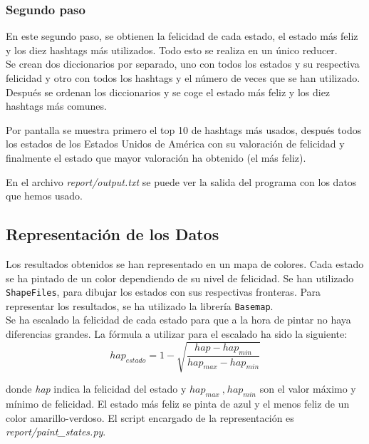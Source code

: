 \documentclass[12pt,a4paper]{article}
\begin{document}
\begin{itemize}
\subsubsection{Segundo paso}

En este segundo paso, se obtienen  la felicidad de cada estado, el estado más feliz y los diez hashtags más utilizados. Todo esto se realiza en un único reducer.\\

Se crean dos diccionarios por separado, uno con todos los estados y su respectiva felicidad y otro con todos los hashtags y el número de veces que se han utilizado. Después se ordenan los diccionarios y se coge el estado más feliz y los diez hashtags más comunes.

Por pantalla se muestra primero el top 10 de hashtags más usados, después todos los estados de los Estados Unidos de América con su valoración de felicidad y finalmente el estado que mayor valoración ha obtenido (el más feliz).

En el archivo \textit{report/output.txt} se puede ver la salida del programa con los datos que hemos usado.
\end{itemize}

\subsection{Representación de los Datos}
Los resultados obtenidos se han representado en un mapa de colores. Cada estado se ha pintado de un color dependiendo de su nivel de felicidad. Se han utilizado \texttt{ShapeFiles}, para dibujar los estados con sus respectivas fronteras. Para representar los resultados, se ha utilizado la librería \texttt{Basemap}.\\

Se ha escalado la felicidad de cada estado para que a la hora de pintar no haya diferencias grandes. La fórmula a utilizar para el escalado ha sido la siguiente:
$$hap_{estado}=1-\displaystyle \sqrt{\dfrac{hap-hap_{min}}{hap_{max}-hap_{min}}}$$

donde \textit{hap} indica la felicidad del estado y $hap_{max}\ \text{,}\ hap_{min}$ son el valor máximo y mínimo de felicidad.
El estado más feliz se pinta de azul y el menos feliz de un color amarillo-verdoso. El script encargado de la representación es \textit{report/paint\_states.py}. 
\end{document}
